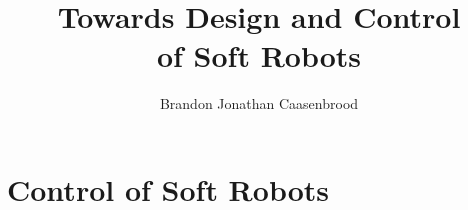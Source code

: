 \documentclass[12pt]{phd}
\title{Towards Design and Control \\ of Soft Robots}
\author{Brandon Jonathan Caasenbrood}
\begin{document}
%

% 
%
%
%
\chapter{Control of Soft Robots}




\appendix
%
%


\end{document}
